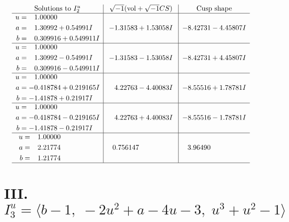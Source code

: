 \documentclass[1p]{elsarticle_modified}
\theoremstyle{definition}
\newcommand{\I}{\sqrt{-1}}
\begin{document}
$$\begin{array}{c|c|c}  
\text{Solutions to }I^u_{2}& \I (\text{vol} + \sqrt{-1}CS) & \text{Cusp shape}\\
 \hline 
\begin{aligned}
u &= \phantom{-}1.00000\phantom{ +0.000000I} \\
a &= \phantom{-}1.30992 + 0.54991 I \\
b &= \phantom{-}0.309916 + 0.549911 I\end{aligned}
 & -1.31583 + 1.53058 I & -8.42731 - 4.45807 I \\ \hline\begin{aligned}
u &= \phantom{-}1.00000\phantom{ +0.000000I} \\
a &= \phantom{-}1.30992 - 0.54991 I \\
b &= \phantom{-}0.309916 - 0.549911 I\end{aligned}
 & -1.31583 - 1.53058 I & -8.42731 + 4.45807 I \\ \hline\begin{aligned}
u &= \phantom{-}1.00000\phantom{ +0.000000I} \\
a &= -0.418784 + 0.219165 I \\
b &= -1.41878 + 0.21917 I\end{aligned}
 & \phantom{-}4.22763 - 4.40083 I & -8.55516 + 1.78781 I \\ \hline\begin{aligned}
u &= \phantom{-}1.00000\phantom{ +0.000000I} \\
a &= -0.418784 - 0.219165 I \\
b &= -1.41878 - 0.21917 I\end{aligned}
 & \phantom{-}4.22763 + 4.40083 I & -8.55516 - 1.78781 I \\ \hline\begin{aligned}
u &= \phantom{-}1.00000\phantom{ +0.000000I} \\
a &= \phantom{-}2.21774\phantom{ +0.000000I} \\
b &= \phantom{-}1.21774\phantom{ +0.000000I}\end{aligned}
 & \phantom{-}0.756147\phantom{ +0.000000I} & \phantom{-}3.96490\phantom{ +0.000000I}\\
 \hline 
 \end{array}$$\newpage\newpage\renewcommand{\arraystretch}{1}
\centering \section*{III. $I^u_{3}= \langle b-1,\;-2 u^2+a-4 u-3,\;u^3+u^2-1 \rangle$}
\end{document}
